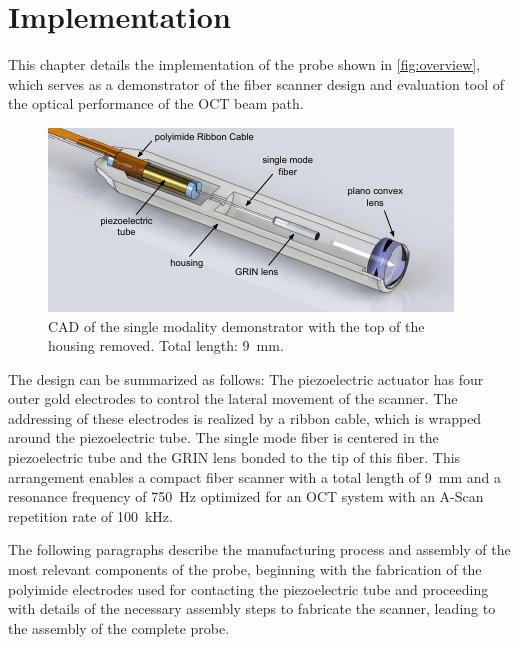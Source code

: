 %
\chapter{Implementation}
\label{Ch:Fab}	

This chapter details the implementation of the probe shown in \autoref{fig:overview}, which serves as a demonstrator of the fiber scanner design and evaluation tool of the optical performance of the OCT beam path.

\begin{figure}[h!]\centering 
\includegraphics[width=\columnwidth]{figures/40_Fabrication/overview.pdf}
      \caption{CAD of the single modality demonstrator with the top of the housing removed. Total length: \SI{9}{\milli\meter}.}
      \label{fig:overview}
\end{figure}

The design can be summarized as follows: The piezoelectric actuator has four outer gold electrodes to control the lateral movement of the scanner. The addressing of these electrodes is realized by a ribbon cable, which is wrapped around the piezoelectric tube. The single mode fiber is centered in the piezoelectric tube and the GRIN lens bonded to the tip of this fiber. This arrangement enables a compact fiber scanner with a total length of \SI{9}{\milli\meter} and a resonance frequency of \SI{750}{\hertz} optimized for an OCT system with an A-Scan repetition rate of \SI{100}{\kilo\hertz}.

The following paragraphs describe the manufacturing process and assembly of the most relevant components of the probe, beginning with the fabrication of the polyimide electrodes used for contacting the piezoelectric tube and proceeding with details of the necessary assembly steps to fabricate the scanner, leading to the assembly of the complete probe.


